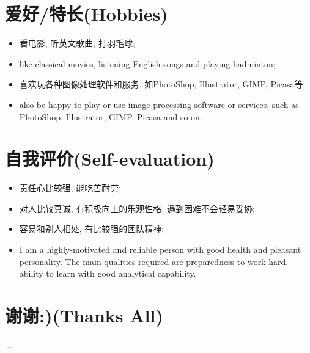 \documentclass[letterpaper,10pt,english]{manual}
\begin{document}
\section{爱好/特长(Hobbies)}
\begin{itemize}
\item {} 
看电影, 听英文歌曲, 打羽毛球;

\item {} 
like classical movies, listening English songs and playing badminton;

\item {} 
喜欢玩各种图像处理软件和服务, 如PhotoShop, Illustrator, GIMP, Picasa等.

\item {} 
also be happy to play or use image processing software or services, such as PhotoShop, Illustrator, GIMP, Picasa and so on.

\end{itemize}


\section{自我评价(Self-evaluation)}
\begin{itemize}
\item {} 
责任心比较强, 能吃苦耐劳;

\item {} 
对人比较真诚, 有积极向上的乐观性格, 遇到困难不会轻易妥协;

\item {} 
容易和别人相处, 有比较强的团队精神;

\item {} 
I am a highly-motivated and reliable person with good health and pleasant personality. The main qualities required are preparedness to work hard, ability to learn with good analytical capability.

\end{itemize}


\section{谢谢:)(Thanks All)}

...


\renewcommand{\indexname}{Module Index}
\printmodindex
\renewcommand{\indexname}{Index}
\printindex
\end{document}
